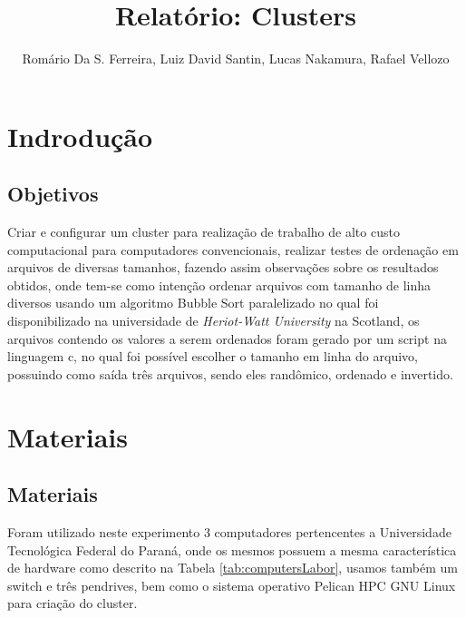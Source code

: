 \documentclass[12pt]{article}
\title{\textbf{Relatório}: Clusters}
\author{
    Romário Da S. Ferreira\inst{1},
    Luiz David Santin\inst{2},
    Lucas Nakamura\inst{3},
    Rafael Vellozo \inst{4}
}
\begin{document}
 

\maketitle

\section{Indrodução}
\subsection{Objetivos}

Criar e configurar um cluster para realização de trabalho de alto custo computacional para computadores convencionais, realizar testes de ordenação em arquivos de diversas tamanhos, fazendo assim observações sobre os resultados obtidos, onde tem-se como intenção ordenar arquivos com tamanho de linha diversos usando um algoritmo Bubble Sort paralelizado no qual foi disponibilizado na universidade de \textit{Heriot-Watt University} na Scotland, os arquivos contendo os valores a serem ordenados foram gerado por um script na linguagem c, no qual foi possível escolher o tamanho em linha do arquivo, possuindo como saída três arquivos, sendo eles randômico, ordenado e invertido.

\section{Materiais} \label{sec:firstpage}
\subsection{Materiais}

Foram utilizado neste experimento 3 computadores pertencentes a Universidade Tecnológica Federal do Paraná, onde os mesmos
possuem a mesma característica de hardware como descrito na Tabela \ref{tab:computersLabor}, usamos também um switch e três pendrives, bem como o sistema operativo Pelican HPC GNU Linux para criação do cluster.
\end{document}
